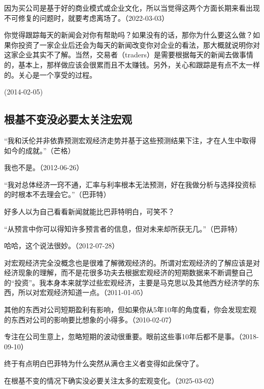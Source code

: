 
因为买公司是基于好的商业模式或企业文化，所以当觉得这两个方面长期来看出现不可修复的问题时，就要考虑离场了。（2022-03-03）

你觉得跟踪每天的新闻会对你有帮助吗？如果没有的话，那你为什么要这么做？如果你投资了一家企业后还会为每天的新闻改变你对企业的看法，那大概就说明你对这家企业其实不了解。当然，交易者（traders）是需要根据每天的新闻去做事情的，基本上，那样做应该会很累而且不太赚钱。另外，关心和跟踪是有点不太一样的。关心是一个享受的过程。

(2014-02-05)

\subsection{根基不变没必要太关注宏观}

“我和沃伦并非依靠预测宏观经济走势并基于这些预测结果下注，才在人生中取得如今的成就。”（芒格）

我也不是。（2012-06-26）

“我对总体经济一窍不通，汇率与利率根本无法预测，好在我做分析与选择投资标的时根本不去理会它。”（巴菲特）

好多人以为自己看看新闻就能比巴菲特明白，可笑不？

“从预言中你可以得知许多预言者的信息，但对未来却所获无几。”（巴菲特）

哈哈，这个说法很妙。（2012-07-28）


对宏观经济完全没概念也是很难了解微观经济的。所谓对宏观经济的了解应该是对经济现象的理解，而不是花很多功夫去根据宏观经济的短期数据来不断调整自己的“投资”。我本身本来就学过些宏观经济，主要是马克思以及其他西方经济学的东西，所以对宏观经济知道一点。（2011-01-05）

其他的东西对公司短期盈利有影响，但如果你从5年10年的角度看，你会发现宏观的东西对公司的影响要比想象的小得多。（2010-02-07）

专注在公司生意上，忽略短期的波动很重要。眼前这些事10年后都不是事。（2018-09-10）


终于有点明白巴菲特为什么突然从满仓主义者变得如此保守了。


在根基不变的情况下确实没必要关注太多的宏观变化。（2025-03-02）

